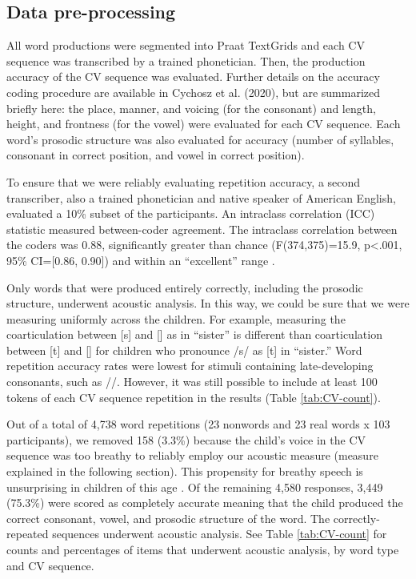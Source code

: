\documentclass[a4paper,man,natbib,donotrepeattitle, apacite]{apa6}
\begin{document}
\subsection{Data pre-processing}

All word productions were segmented into Praat TextGrids \cite{boersmaPraatDoingPhonetics2018} and each CV sequence was transcribed by a trained phonetician. Then, the production accuracy of the CV sequence was evaluated. Further details on the accuracy coding procedure are available in Cychosz et al. (2020), but are summarized briefly here: the place, manner, and voicing (for the consonant) and length, height, and frontness (for the vowel) were evaluated for each CV sequence. Each word’s prosodic structure was also evaluated for accuracy (number of syllables, consonant in correct position, and vowel in correct position). 

To ensure that we were reliably evaluating repetition accuracy, a second transcriber, also a trained phonetician and native speaker of American English, evaluated a 10\% subset of the participants. An intraclass correlation (ICC) statistic measured between-coder agreement. The intraclass correlation between the coders was 0.88, significantly greater than chance (F(374,375)=15.9, p<.001, 95\% CI=[0.86, 0.90]) and within an ``excellent'' range \cite{cicchettiGuidelinesCriteriaRules1994}. 

Only words that were produced entirely correctly, including the prosodic structure, underwent acoustic analysis. In this way, we could be sure that we were measuring uniformly across the children. For example, measuring the coarticulation between [s] and [\textsci] as in ``sister'' is different than coarticulation between [t] and [\textsci] for children who pronounce /s/ as [t] in ``sister.'' Word repetition accuracy rates were lowest for stimuli containing late-developing consonants, such as /\textturnr/. However, it was still possible to include at least 100 tokens of each CV sequence repetition in the results (Table \ref{tab:CV-count}).

Out of a total of 4,738 word repetitions (23 nonwords and 23 real words x 103 participants), we removed 158 (3.3\%) because the child’s voice in the CV sequence was too breathy to reliably employ our acoustic measure (measure explained in the following section). This propensity for breathy speech is unsurprising in children of this age \cite{leeAcousticsChildrenSpeech1999}. Of the remaining 4,580 responses, 3,449 (75.3\%) were scored as completely accurate meaning that the child produced the correct consonant, vowel, and prosodic structure of the word. The correctly-repeated sequences underwent acoustic analysis. See Table \ref{tab:CV-count} for counts and percentages of items that underwent acoustic analysis, by word type and CV sequence.
\end{document}
